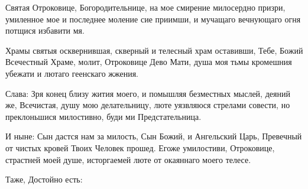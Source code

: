 Святая Отроковице, Богородительнице, на мое смирение милосердно призри, умиленное мое и последнее моление сие приимши, и мучащаго вечнующаго огня потщися избавити мя.


Храмы святыя осквернившая, скверный и телесный храм оставивши, Тебе, Божий Всечестный Храме, молит, Отроковице Дево Мати, душа моя тьмы кромешния убежати и лютаго геенскаго жжения.


Слава: Зря конец близу жития моего, и помышляя безместных мыслей, деяний же, Всечистая, душу мою делательницу, люте уязвляюся стрелами совести, но преклоньшися милостивно, буди ми Предстательница.


И ныне: Сын дастся нам за милость, Сын Божий, и Ангельский Царь, Превечный от чистых кровей Твоих Человек прошед. Егоже умилостиви, Отроковице, страстней моей душе, исторгаемей люте от окаяннаго моего телесе.


Таже, Достойно есть:


\mychapterending